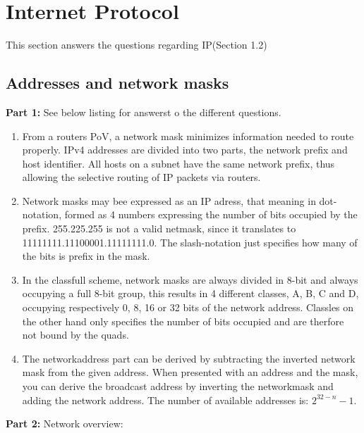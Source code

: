 \section{Internet Protocol}
This section answers the questions regarding IP(Section 1.2)

\subsection{Addresses and network masks}
\textbf{Part 1: } See below listing for answerst o the different questions.

\begin{enumerate}
\item From a routers PoV, a network mask minimizes information needed to route properly.
    IPv4 addresses are divided into two parts, the network prefix and host identifier.
    All hosts on a subnet have the same network prefix, thus allowing the selective routing
    of IP packets via routers.
\item Network masks may bee expressed as an IP adress, that meaning in
    dot-notation, formed as 4 numbers expressing the number of bits occupied by the
    prefix. 255.225.255 is not a valid netmask, since it translates to
    11111111.11100001.11111111.0. The slash-notation just specifies how many of the
    bits is prefix in the mask.
\item In the classfull scheme, network masks are always divided in 8-bit and
    always occupying a full 8-bit group, this results in 4 different classes, A, B,
    C and D, occupying respectively 0, 8, 16 or 32 bits of the network address.
    Classles on the other hand only specifies the number of bits occupied and are
    therfore not bound by the quads.
\item The networkaddress part can be derived by subtracting the inverted
    network mask from the given address. When presented with an address and the 
    mask, you can derive the broadcast address by inverting the networkmask and 
    adding the network address. The number of available addresses is: 
    $2^{32 - n}-1$.
\end{enumerate}

\textbf{Part 2: } Network overview:


